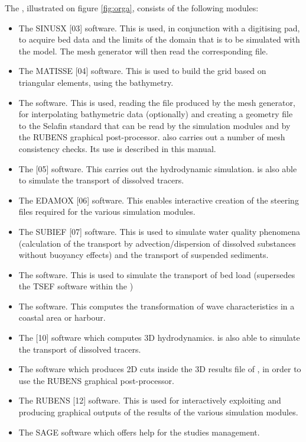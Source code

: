 The \telemacsystem, illustrated on figure \ref{fig:orga}, consists of the following
modules:
\begin{itemize}
\item The SINUSX [03] software. This is used, in conjunction with a digitising
pad, to acquire bed data and the limits of the domain that is to be simulated
with the model. The mesh generator will then read the corresponding file.
\item The MATISSE [04] software. This is used to build the grid based on
triangular elements, using the bathymetry.
\item The \stbtel software. This is used, reading the file produced by the mesh
generator, for interpolating bathymetric data (optionally) and creating a
geometry file to the Selafin standard that can be read by the simulation
modules and by the RUBENS graphical post-processor. \stbtel also carries out a
number of mesh consistency checks. Its use is described in this manual.
\item The  [05] software. This carries out the hydrodynamic
simulation.  is also able to simulate the transport of dissolved
tracers.
\item The EDAMOX [06] software. This enables interactive creation of the
steering files required for the various simulation modules.
\item The SUBIEF [07] software. This is used to simulate water quality
phenomena (calculation of the transport by advection/dispersion of dissolved
substances without buoyancy effects) and the transport of suspended sediments.
\item The \sisyphe [08] software. This is used to simulate the transport of bed
load (\sisyphe supersedes the TSEF software within the \telemacsystem)
\item The \artemis [09] software. This computes the transformation of wave
characteristics in a coastal area or harbour.
\item The  [10] software which computes 3D hydrodynamics.
 is also able to simulate the transport of dissolved tracers.
\item The \postel [11] software which produces 2D cuts inside the 3D results
file of , in order to use the RUBENS graphical post-processor.
\item The RUBENS [12] software. This is used for interactively exploiting and
producing graphical outputs of the results of the various simulation modules.
\item The SAGE software which offers help for the studies management.
\end{itemize}

